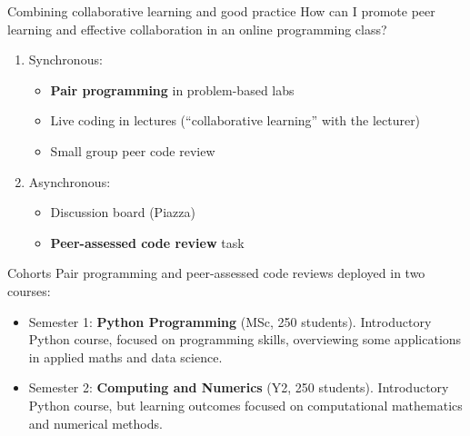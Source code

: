 \documentclass[aspectratio=169, 12pt]{beamer}
\begin{document}



\begin{frame}{Combining collaborative learning and good practice}
    How can I promote peer learning and effective collaboration in an online programming class?
    \begin{enumerate}
        \item<1-> Synchronous:
            \begin{itemize}
                \item \textbf{Pair programming} in problem-based labs
                \item Live coding in lectures (``collaborative learning'' with the lecturer)
                \item Small group peer code review
            \end{itemize}
        \item<2-> Asynchronous:
            \begin{itemize}
                \item Discussion board (Piazza)
                \item \textbf{Peer-assessed code review} task
            \end{itemize}
    \end{enumerate}
\end{frame}

\begin{frame}{Cohorts}
    Pair programming and peer-assessed code reviews deployed in two courses:
    \begin{itemize}
        \item<1-> Semester 1: \textbf{Python Programming} (MSc, 250 students). Introductory Python course, focused on programming skills, overviewing some applications in applied maths and data science.
        \item<2-> Semester 2: \textbf{Computing and Numerics} (Y2, 250 students). Introductory Python course, but learning outcomes focused on computational mathematics and numerical methods.
    \end{itemize}
\end{frame}
\end{document}

